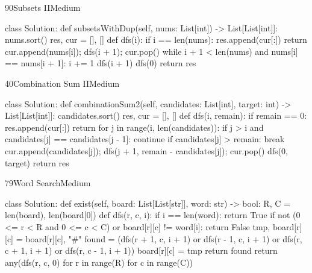 \begin{problem}{90}{Subsets II}{Medium}
\begin{code}
class Solution:
    def subsetsWithDup(self, nums: List[int]) -> List[List[int]]:
        nums.sort()
        res, cur = [], []
        def dfs(i):
            if i == len(nums):
                res.append(cur[:])
                return
            cur.append(nums[i]); dfs(i + 1); cur.pop()
            while i + 1 < len(nums) and nums[i] == nums[i + 1]:
                i += 1
            dfs(i + 1)
        dfs(0)
        return res
\end{code}
\end{problem}

\begin{problem}{40}{Combination Sum II}{Medium}
\begin{code}
class Solution:
    def combinationSum2(self, candidates: List[int], target: int) -> List[List[int]]:
        candidates.sort()
        res, cur = [], []
        def dfs(i, remain):
            if remain == 0:
                res.append(cur[:])
                return
            for j in range(i, len(candidates)):
                if j > i and candidates[j] == candidates[j - 1]:
                    continue
                if candidates[j] > remain:
                    break
                cur.append(candidates[j]); dfs(j + 1, remain - candidates[j]); cur.pop()
        dfs(0, target)
        return res
\end{code}
\end{problem}

\begin{problem}{79}{Word Search}{Medium}
\begin{code}
class Solution:
    def exist(self, board: List[List[str]], word: str) -> bool:
        R, C = len(board), len(board[0])
        def dfs(r, c, i):
            if i == len(word):
                return True
            if not (0 <= r < R and 0 <= c < C) or board[r][c] != word[i]:
                return False
            tmp, board[r][c] = board[r][c], "#"
            found = (dfs(r + 1, c, i + 1) or dfs(r - 1, c, i + 1) or
                     dfs(r, c + 1, i + 1) or dfs(r, c - 1, i + 1))
            board[r][c] = tmp
            return found
        return any(dfs(r, c, 0) for r in range(R) for c in range(C))
\end{code}
\end{problem}

